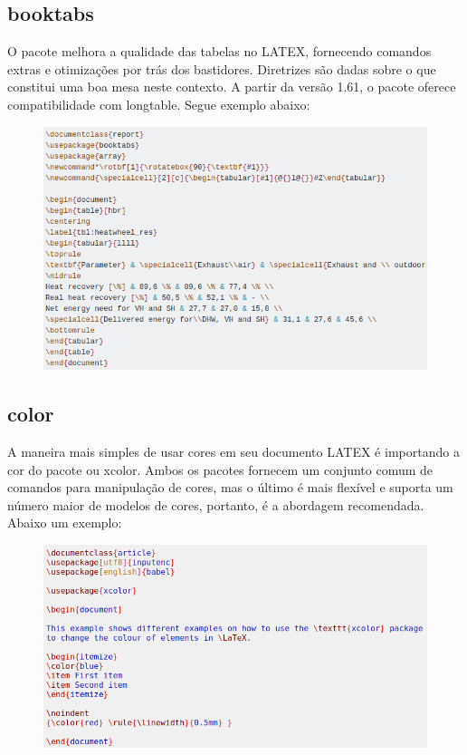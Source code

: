 \documentclass[12pt]{article}
\begin{document}
		
		\subsection{booktabs}
			O pacote melhora a qualidade das tabelas no LATEX, fornecendo comandos extras e otimizações por trás dos bastidores. Diretrizes são dadas sobre o que constitui uma boa mesa neste contexto. A partir da versão 1.61, o pacote oferece compatibilidade com longtable. Segue exemplo abaixo:
			\begin{figure}[h]
				\centering
				\includegraphics[scale=0.6]{5i.png}
			\end{figure}
			\newpage
		
		\subsection{color}
			A maneira mais simples de usar cores em seu documento LATEX é importando a cor do pacote ou xcolor. Ambos os pacotes fornecem um conjunto comum de comandos para manipulação de cores, mas o último é mais flexível e suporta um número maior de modelos de cores, portanto, é a abordagem recomendada. Abaixo um exemplo:
			\begin{figure}[h]
				\centering
				\includegraphics[scale=0.5]{4i.png}
			\end{figure}
			\newpage
			
\end{document}
